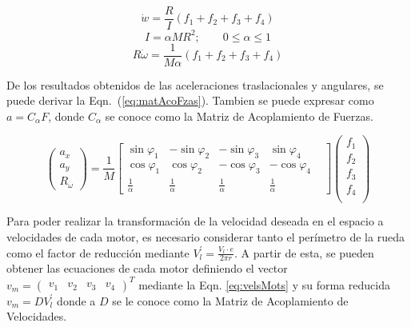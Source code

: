 \documentclass[twocolumn,10pt]{amrob}
\begin{document}
\begin{equation}
  \dot{w} =\frac{R}{I}\left(f_1+f_2+f_3+f_4\right) \label{eq:omega4Mots}
\end{equation}
\begin{equation}
  I = \alpha M R^{2} ;\qquad 0\leq \alpha \leq1 \label{eq:inercia}
\end{equation}
\begin{equation}
  R\dot{\omega} = \frac{1}{M\alpha}\left(f_1+f_2+f_3+f_4\right) \label{eq:Romega}
\end{equation}

De los resultados obtenidos de las aceleraciones traslacionales y angulares, se puede derivar la Eqn.~(\ref{eq:matAcoFzas}). Tambien se puede expresar como \(a=C_\alpha F \), donde \( C_\alpha \) se conoce como la Matriz de Acoplamiento de Fuerzas. \par

\begin{equation}
  \left(\begin{array}{c}
    a_x \\ a_y \\R_{\dot{\omega}}
  \end{array}\right)= \frac{1}{M}
  \begin{bmatrix}
    \sin\varphi_1 & -\sin\varphi_2 & -\sin\varphi_3 & \sin\varphi_4 \\
    \cos\varphi_1 & \cos\varphi_2 & -\cos\varphi_3 & -\cos\varphi_4 & \\
    \frac{1}{\alpha} & \frac{1}{\alpha}  & \frac{1}{\alpha}  &\frac{1}{\alpha} 
  \end{bmatrix}
  \left(\begin{array}{c}
    f_1 \\ f_2 \\ f_3 \\ f_4  \label{eq:matAcoFzas}\\ 
  \end{array}\right) 
\end{equation}

Para poder realizar la transformación de la velocidad deseada en el espacio a velocidades de cada motor, es necesario considerar tanto el perímetro de la rueda como el factor de reducción mediante \(V_{l}^{'} = \frac{ V_l \cdot e } { 2 \pi r} \). A partir de esta, se pueden obtener las ecuaciones de cada motor definiendo el vector \( v_m = \begin{pmatrix}v_1 & v_2 & v_3 & v_4\end{pmatrix} ^{T}\) mediante la Eqn. \eqref{eq:velsMots}  y su forma reducida \(v_m = D V_{l}^{'}\) donde a \( D \) se le conoce como la Matriz de Acoplamiento de Velocidades. \par 
\end{document}
